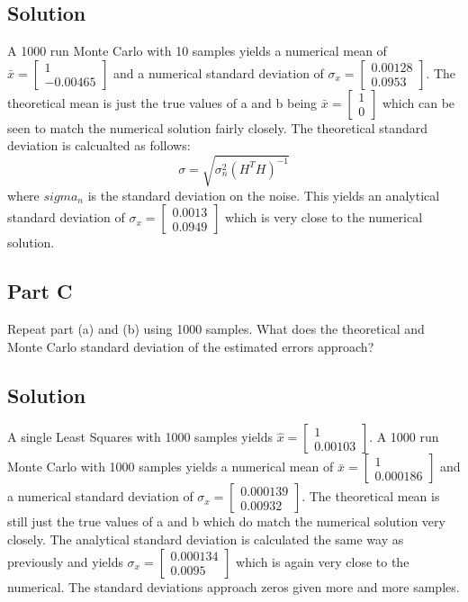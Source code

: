 \documentclass{article}
\begin{document}
\subsection*{Solution}
A 1000 run Monte Carlo with 10 samples yields a numerical mean of $\bar{x} = \begin{bmatrix} 1 \\ -0.00465 \end{bmatrix}$ and a numerical 
standard deviation of $\sigma_x = \begin{bmatrix} 0.00128 \\ 0.0953 \end{bmatrix}$.  The theoretical mean is just the true values of a and b
being $\bar{x} = \begin{bmatrix} 1 \\ 0 \end{bmatrix}$ which can be seen to match the numerical solution fairly closely.  The theoretical 
standard deviation is calcualted as follows:
\begin{equation}
    \sigma = \sqrt{\sigma_n^2(H^T H)^{-1}}
\end{equation}
where $sigma_n$ is the standard deviation on the noise.  This yields an analytical standard deviation of 
$\sigma_x = \begin{bmatrix} 0.0013 \\ 0.0949 \end{bmatrix}$ which is very close to the numerical solution.

\subsection*{Part C}
Repeat part (a) and (b) using 1000 samples.  What does the theoretical and Monte Carlo standard deviation of the estimated errors approach?
\subsection*{Solution}
A single Least Squares with 1000 samples yields $\hat{x} = \begin{bmatrix} 1 \\ 0.00103 \end{bmatrix}$.  A 1000 run Monte Carlo with 1000 
samples yields a numerical mean of $\bar{x} = \begin{bmatrix} 1 \\ 0.000186 \end{bmatrix}$ and a numerical standard deviation of 
$\sigma_x = \begin{bmatrix} 0.000139 \\ 0.00932 \end{bmatrix}$.  The theoretical mean is still just the true values of a and b which do match 
the numerical solution very closely.  The analytical standard deviation is calculated the same way as previously and yields 
$\sigma_x = \begin{bmatrix} 0.000134 \\ 0.0095 \end{bmatrix}$ which is again very close to the numerical. The standard deviations approach zeros 
given more and more samples.
\end{document}
